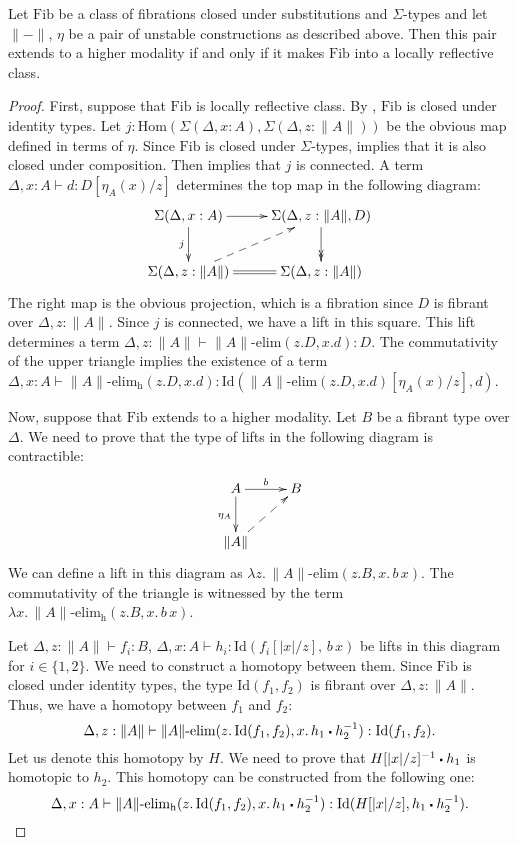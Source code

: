 \documentclass[reqno]{amsart}
\theoremstyle{definition}
\theoremstyle{remark}
\newcommand{\fs}[1]{\mathrm{#1}}
\newcommand{\Hom}{\fs{Hom}}
\newcommand{\Id}{\fs{Id}}
\newcommand{\sym}[1]{#1^{-1}}
\newcommand{\Fib}{\fs{Fib}}
\numberwithin{figure}{section}
\newcommand{\ct}{%
  \mathchoice{\mathbin{\raisebox{0.25ex}{$\displaystyle\centerdot$}}}%
             {\mathbin{\raisebox{0.25ex}{$\centerdot$}}}%
             {\mathbin{\raisebox{0.25ex}{$\scriptstyle\,\centerdot\,$}}}%
             {\mathbin{\raisebox{0.25ex}{$\scriptscriptstyle\,\centerdot\,$}}}
}
\begin{document}
\begin{prop}
Let $\Fib$ be a class of fibrations closed under substitutions and $\Sigma$-types and let $\| - \|$, $\eta$ be a pair of unstable constructions as described above.
Then this pair extends to a higher modality if and only if it makes $\Fib$ into a locally reflective class.
\end{prop}
\begin{proof}
First, suppose that $\Fib$ is locally reflective class.
By , $\Fib$ is closed under identity types.
Let $j : \Hom(\Sigma(\Delta, x : A), \Sigma(\Delta, z : \| A \|))$ be the obvious map defined in terms of $\eta$.
Since $\Fib$ is closed under $\Sigma$-types,  implies that it is also closed under composition.
Then  implies that $j$ is connected.
A term $\Delta, x : A \vdash d : D[\eta_A(x)/z]$ determines the top map in the following diagram:
\[ \xymatrix{ \Sigma(\Delta, x : A) \ar[r] \ar[d]_j                  & \Sigma(\Delta, z : \| A \|, D) \ar@{->>}[d] \\
              \Sigma(\Delta, z : \| A \|) \ar@{-->}[ur] \ar@{=}[r]  & \Sigma(\Delta, z : \| A \|)
            } \]
The right map is the obvious projection, which is a fibration since $D$ is fibrant over $\Delta, z : \| A \|$.
Since $j$ is connected, we have a lift in this square.
This lift determines a term $\Delta, z : \| A \| \vdash \| A \|\text{-}\fs{elim}(z.D, x.d) : D$.
The commutativity of the upper triangle implies the existence of a term $\Delta, x : A \vdash \| A \|\text{-}\fs{elim_h}(z.D, x.d) : \Id(\| A \|\text{-}\fs{elim}(z.D, x.d)[\eta_A(x)/z],d)$.

Now, suppose that $\Fib$ extends to a higher modality.
Let $B$ be a fibrant type over $\Delta$.
We need to prove that the type of lifts in the following diagram is contractible:
\[ \xymatrix{ A \ar[r]^b \ar[d]_{\eta_A} & B \\
              \| A \| \ar@{-->}[ur]
            } \]
We can define a lift in this diagram as $\lambda z.\,\| A \|\text{-}\fs{elim}(z.B, x.\,b\,x)$.
The commutativity of the triangle is witnessed by the term $\lambda x.\,\| A \|\text{-}\fs{elim_h}(z.B, x.\,b\,x)$.

Let $\Delta, z : \| A \| \vdash f_i : B$, $\Delta, x : A \vdash h_i : \Id(f_i[|x|/z],\,b\,x)$ be lifts in this diagram for $i \in \{1,2\}$.
We need to construct a homotopy between them.
Since $\Fib$ is closed under identity types, the type $\Id(f_1,f_2)$ is fibrant over $\Delta, z : \| A \|$.
Thus, we have a homotopy between $f_1$ and $f_2$:
\[ \Delta, z : \| A \| \vdash \| A \|\text{-}\fs{elim}(z.\,\Id(f_1,f_2), x.\,h_1 \ct \sym{h_2}) : \Id(f_1, f_2). \]
Let us denote this homotopy by $H$.
We need to prove that $\sym{H[|x|/z]} \ct h_1$ is homotopic to $h_2$.
This homotopy can be constructed from the following one:
\[ \Delta, x : A \vdash \| A \|\text{-}\fs{elim_h}(z.\,\Id(f_1,f_2), x.\,h_1 \ct \sym{h_2}) : \Id(H[|x|/z], h_1 \ct \sym{h_2}). \]
\end{proof}
\end{document}
